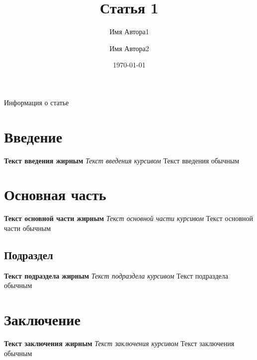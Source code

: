 \documentclass[14pt]{article}
\title{Статья 1}
\author{Имя Автора1 \and Имя Автора2}
\date{\today}
\begin{document}
\maketitle

\begin{center}
    {\huge Информация о статье}
\end{center}
\hfill \break
\renewcommand{\contentsname}{Содержание}
\tableofcontents
\thispagestyle{empty}

\newpage
\begin{multicols}{3}
\section{Введение}
\raggedright
\small{\textbf{Текст введения жирным} \textit{Текст введения курсивом} Текст введения обычным}

\section{Основная часть}
\raggedright
\large{\textbf{Текст основной части жирным} \textit{Текст основной части курсивом} Текст основной части обычным}

\subsection{Подраздел}
\large{\textbf{Текст подраздела жирным} \textit{Текст подраздела курсивом} Текст подраздела обычным}

\section{Заключение}
\raggedright
\huge{\textbf{Текст заключения жирным} \textit{Текст заключения курсивом} Текст заключения обычным}
\end{multicols}
\end{document}
